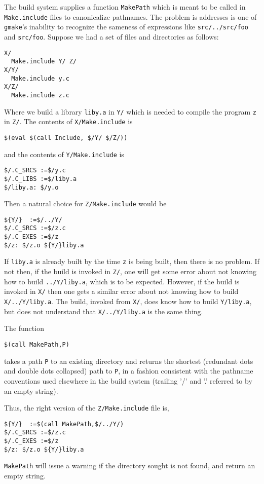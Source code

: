 \documentclass[letterpaper]{article}
\begin{document}
The build system supplies a function \verb+MakePath+ which is
meant to be called in \verb+Make.include+ files to canonicalize pathnames.
The problem is addresses is one of \verb+gmake+'s inability to recognize
the sameness of expressions like \verb+src/../src/foo+ and \verb+src/foo+.
Suppose we had a set of files and directories as follows:
\begin{verbatim}
X/
  Make.include Y/ Z/
X/Y/
  Make.include y.c
X/Z/
  Make.include z.c
\end{verbatim}
Where we build a library \verb+liby.a+ in \verb+Y/+ which is needed to
compile the program \verb+z+ in \verb+Z/+.  The contents of
\verb+X/Make.include+ is
\begin{verbatim}
$(eval $(call Include, $/Y/ $/Z/))
\end{verbatim}
and the contents of \verb+Y/Make.include+ is
\begin{verbatim}
$/.C_SRCS :=$/y.c
$/.C_LIBS :=$/liby.a
$/liby.a: $/y.o
\end{verbatim}
Then a natural choice for \verb+Z/Make.include+ would be
\begin{verbatim}
${Y/}  :=$/../Y/
$/.C_SRCS :=$/z.c
$/.C_EXES :=$/z
$/z: $/z.o ${Y/}liby.a
\end{verbatim}
If \verb+liby.a+ is already built by the time \verb+z+ is being
built, then there is no problem.  If not then, if the build
is invoked in \verb+Z/+, one will get some error about not
knowing how to build \verb+../Y/liby.a+, which is to be expected.
However, if the build is invoked in \verb+X/+ then one gets
a similar error about not knowing how to build \verb+X/../Y/liby.a+.
The build, invoked from \verb+X/+, does know how to build \verb+Y/liby.a+,
but does not understand that \verb+X/../Y/liby.a+ is the same thing.

The function
\begin{verbatim}
$(call MakePath,P)
\end{verbatim}
takes a path \verb+P+ to an existing directory
and returns the shortest (redundant dots and
double dots collapsed) path to \verb+P+, in a fashion
consistent with the pathname conventions used elsewhere
in the build system
(trailing '/' and '.' referred to by an empty string).

Thus, the right version of the \verb+Z/Make.include+ file is,
\begin{verbatim}
${Y/}  :=$(call MakePath,$/../Y/)
$/.C_SRCS :=$/z.c
$/.C_EXES :=$/z
$/z: $/z.o ${Y/}liby.a
\end{verbatim}
\verb+MakePath+ will issue a warning if the directory sought
is not found, and return an empty string.
\end{document}
